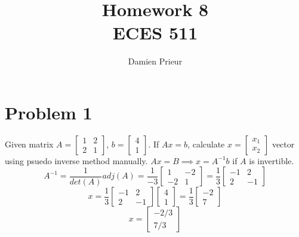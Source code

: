 \documentclass{article}
\author{Damien Prieur}
\title{Homework 8 \\ ECES 511}
\date{}
\begin{document}
\maketitle

\section*{Problem 1}
Given matrix $A = \begin{bmatrix} 1 & 2 \\ 2 & 1 \end{bmatrix}$, $b = \begin{bmatrix}4\\1\end{bmatrix}$.
\newline
If $Ax=b$, calculate $x = \begin{bmatrix} x_1 \\ x_2 \end{bmatrix}$ vector using psuedo inverse method manually.
\newline
$Ax=B \implies x = A^{-1}b$ if $A$ is invertible.
$$ A^{-1} = \frac{1}{det(A)} adj(A)  = \frac{1}{-3} \begin{bmatrix} 1 & -2 \\ -2 & 1 \end{bmatrix} = \frac{1}{3}\begin{bmatrix} -1 & 2 \\ 2 & -1 \end{bmatrix} $$
$$ x = \frac{1}{3}\begin{bmatrix} -1 & 2 \\ 2 & -1 \end{bmatrix} \begin{bmatrix}4\\1\end{bmatrix} = \frac{1}{3}\begin{bmatrix} -2 \\ 7 \end{bmatrix} $$
$$ x = \begin{bmatrix} -2 / 3 \\ 7 / 3 \end{bmatrix} $$

\newpage
\end{document}
